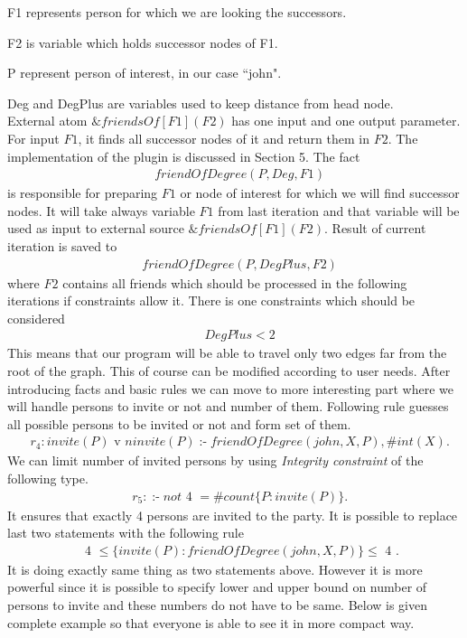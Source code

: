 \documentclass[14pt,a4paper, titlepage]{article}
\newcommand{\ext}[3]{\ensuremath{\&{#1}[#2](#3)}}
\DeclareMathOperator{\leftimpl}{:-}
\begin{document}
F1 represents person for which we are looking the successors.

F2 is variable which holds successor nodes of F1. 

P represent person of interest, in our case ``john".  


Deg and DegPlus are variables used to keep distance from head node.
\\External atom \ext{friendsOf}{F1}{F2} has one input and one output parameter. For input $\mathit{F1}$, 
it finds all successor nodes of it and return them in $\mathit{F2}$. The implementation of the plugin is discussed in Section 5. The fact
\begin{align*}
& \mathit{friendOfDegree(P, Deg, F1)}
\end{align*}
is responsible for preparing $\mathit{F1}$ or node of interest for which we will find successor nodes. 
It will take always variable $\mathit{F1}$ from last iteration and that variable will be used as input to 
external source \ext{\mathit{friendsOf}}{F1}{F2}.
Result of current iteration is saved to 
\begin{align*}
& \mathit{friendOfDegree(P, DegPlus, F2)}
\end{align*} 
where $\mathit{F2}$ contains all friends which should be processed in the following iterations if constraints allow it. 
There is one constraints which should be considered
\begin{align*}
& \mathit{DegPlus < 2}
\end{align*}
This means that our program will be able to travel only two edges far from the root of the graph. This of course can be modified according to user needs. After introducing facts and basic rules we can move to more interesting part where we will handle persons to invite or not and number of them. Following rule guesses all possible persons to be invited or not and form set of them.
\begin{align*}
& r_4: \mathit{invite(P)} \text{ v } \mathit{ninvite(P) \leftimpl friendOfDegree(john,X,P), \#int(X).}
\end{align*}     
We can limit number of invited persons by using \emph{Integrity constraint} of the following type.
\begin{align*}
& r_5: \leftimpl \mathit{not} \text{ 4 } = \mathit{\#count} \{ P : \mathit{invite(P)} \}.
\end{align*} 
It ensures that exactly 4 persons are invited to the party. It is possible to replace 
last two statements with the following rule
\begin{align*}
& \text{ 4 } \leq \{ invite(P) : friendOfDegree(john,X,P) \} \leq \text{ 4 }. 
\end{align*}
It is doing exactly same thing as two statements above. However it is more powerful since it is 
possible to specify lower and upper bound on number of persons to invite and these numbers do not 
have to be same. Below is given complete example so that everyone is able to see it in more compact way.
  
\end{document}
